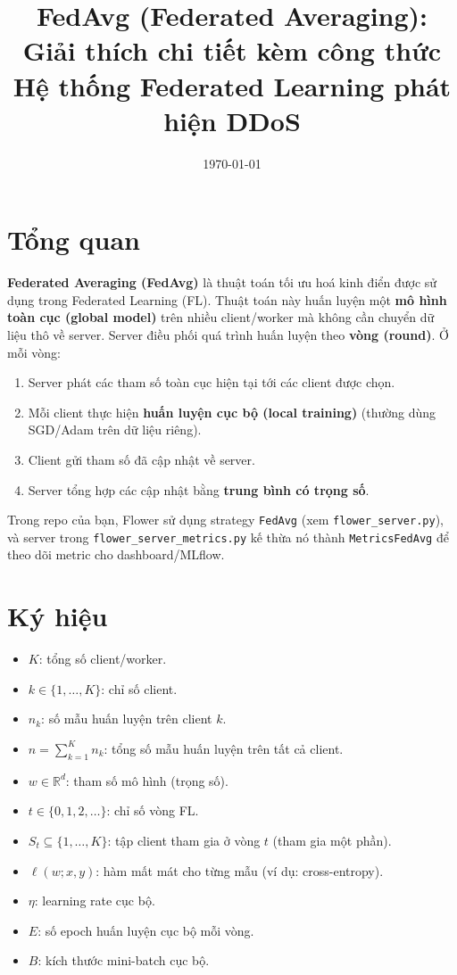 \documentclass[12pt,a4paper]{article}
\title{FedAvg (Federated Averaging): Giải thích chi tiết kèm công thức\\Hệ thống Federated Learning phát hiện DDoS}
\author{}
\date{\today}
\begin{document}
\maketitle

\section{Tổng quan}

\textbf{Federated Averaging (FedAvg)} là thuật toán tối ưu hoá kinh điển được sử dụng trong Federated Learning (FL).
Thuật toán này huấn luyện một \textbf{mô hình toàn cục (global model)} trên nhiều client/worker mà không cần chuyển dữ liệu thô về server.
Server điều phối quá trình huấn luyện theo \textbf{vòng (round)}. Ở mỗi vòng:
\begin{enumerate}
    \item Server phát các tham số toàn cục hiện tại tới các client được chọn.
    \item Mỗi client thực hiện \textbf{huấn luyện cục bộ (local training)} (thường dùng SGD/Adam trên dữ liệu riêng).
    \item Client gửi tham số đã cập nhật về server.
    \item Server tổng hợp các cập nhật bằng \textbf{trung bình có trọng số}.
\end{enumerate}

Trong repo của bạn, Flower sử dụng strategy \texttt{FedAvg} (xem \texttt{flower\_server.py}), và server trong \texttt{flower\_server\_metrics.py} kế thừa nó thành \texttt{MetricsFedAvg} để theo dõi metric cho dashboard/MLflow.

\section{Ký hiệu}

\begin{itemize}
    \item $K$: tổng số client/worker.
    \item $k \in \{1,\dots,K\}$: chỉ số client.
    \item $n_k$: số mẫu huấn luyện trên client $k$.
    \item $n = \sum_{k=1}^{K} n_k$: tổng số mẫu huấn luyện trên tất cả client.
    \item $w \in \mathbb{R}^d$: tham số mô hình (trọng số).
    \item $t \in \{0,1,2,\dots\}$: chỉ số vòng FL.
    \item $S_t \subseteq \{1,\dots,K\}$: tập client tham gia ở vòng $t$ (tham gia một phần).
    \item $\ell(w; x, y)$: hàm mất mát cho từng mẫu (ví dụ: cross-entropy).
    \item $\eta$: learning rate cục bộ.
    \item $E$: số epoch huấn luyện cục bộ mỗi vòng.
    \item $B$: kích thước mini-batch cục bộ.
\end{itemize}
\end{document}
